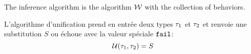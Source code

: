 \documentclass[9pt,preprint]{sigplanconf}
\begin{document}

The inference algorithm is the algorithm $\mathcal{W}$ with the collection of behaviors.

L'algorithme d'unification prend en entrée deux types $\tau_1$ et $\tau_2$ et renvoie une substitution $S$ ou échoue avec la valeur spéciale $\mathtt{fail}$:
\[  \mathcal{U}(\tau_1, \tau_2) = S \]
\end{document}
